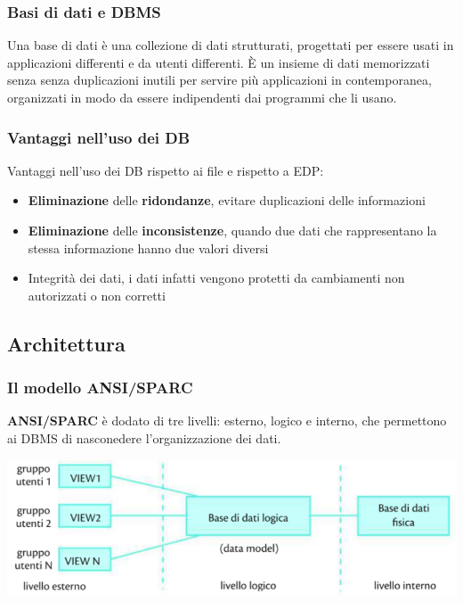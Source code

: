 \documentclass{article}
\begin{document}
\subsubsection{Basi di dati e DBMS}
Una base di dati è una collezione di dati strutturati, progettati per essere usati in applicazioni differenti e da utenti differenti. È un insieme di dati memorizzati senza senza duplicazioni inutili per servire più applicazioni in contemporanea, organizzati in modo da essere indipendenti dai programmi che li usano.

\subsubsection{Vantaggi nell'uso dei DB}
Vantaggi nell'uso dei DB rispetto ai file e rispetto a EDP:
\begin{itemize}
    \item \textbf{Eliminazione} delle \textbf{ridondanze}, evitare duplicazioni delle informazioni
    \item \textbf{Eliminazione} delle \textbf{inconsistenze}, quando due dati che rappresentano la stessa informazione hanno due valori diversi
    \item Integrità dei dati, i dati infatti vengono protetti da cambiamenti non autorizzati o non corretti
\end{itemize}

\subsection{Architettura}
\subsubsection{Il modello ANSI/SPARC}
\textbf{ANSI/SPARC} è dodato di tre livelli: esterno, logico e interno, che permettono ai DBMS di nasconedere l'organizzazione dei dati.

\begin{center}
    \includegraphics[h]{ansi.PNG}
\end{center}
\end{document}
